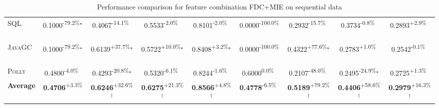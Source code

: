 \begin{table}[htbp]
\begin{tabular}{l|cccc|cccc}
\textsc{SQL} & \cellcolor{red!30}0.1000\textsuperscript{-79.2\%}$^\star$ & \cellcolor{red!30}0.4067\textsuperscript{-14.1\%}$^{\,\,\,}$ & \cellcolor{red!30}0.5533\textsuperscript{-2.0\%}$^{\,\,\,}$ & \cellcolor{red!30}0.8101\textsuperscript{-2.0\%}$^{\,\,\,}$ & \cellcolor{red!30}0.0000\textsuperscript{-100.0\%}$^{\,\,\,}$ & \cellcolor{red!30}0.2932\textsuperscript{-15.7\%}$^{\,\,\,}$ & \cellcolor{red!30}0.3734\textsuperscript{-0.8\%}$^{\,\,\,}$ & \cellcolor{green!30}0.2893\textsuperscript{+2.9\%}$^{\,\,\,}$ \\
\textsc{JavaGC} & \cellcolor{red!30}0.1000\textsuperscript{-79.2\%}$^\star$ & \cellcolor{green!30}0.6139\textsuperscript{+37.7\%}$^\star$ & \cellcolor{green!30}0.5722\textsuperscript{+10.0\%}$^\star$ & \cellcolor{green!30}0.8408\textsuperscript{+3.2\%}$^\star$ & \cellcolor{red!30}0.0000\textsuperscript{-100.0\%}$^{\,\,\,}$ & \cellcolor{green!30}0.4322\textsuperscript{+77.6\%}$^\star$ & \cellcolor{green!30}0.2783\textsuperscript{+1.0\%}$^{\,\,\,}$ & \cellcolor{red!30}0.2542\textsuperscript{-0.1\%}$^{\,\,\,}$ \\
\textsc{Polly} & \cellcolor{red!30}0.4800\textsuperscript{-4.0\%}$^{\,\,\,}$ & \cellcolor{red!30}0.4293\textsuperscript{-20.8\%}$^\star$ & \cellcolor{red!30}0.5320\textsuperscript{-6.1\%}$^{\,\,\,}$ & \cellcolor{red!30}0.8244\textsuperscript{-1.6\%}$^{\,\,\,}$ & \cellcolor{red!30}0.6000\textsuperscript{0.0\%}$^{\,\,\,}$ & \cellcolor{red!30}0.2107\textsuperscript{-48.0\%}$^{\,\,\,}$ & \cellcolor{red!30}0.2495\textsuperscript{-24.9\%}$^\star$ & \cellcolor{green!30}0.2725\textsuperscript{+1.3\%}$^{\,\,\,}$ \\
\hline
\textbf{Average} & \cellcolor{green!30}\textbf{0.4706}\textsuperscript{+3.3\%}$^{\,\,\,}$ & \cellcolor{green!30}\textbf{0.6246}\textsuperscript{+32.6\%}$^\dagger$ & \cellcolor{green!30}\textbf{0.6275}\textsuperscript{+21.3\%}$^\dagger$ & \cellcolor{green!30}\textbf{0.8566}\textsuperscript{+4.8\%}$^\dagger$ & \cellcolor{red!30}\textbf{0.4778}\textsuperscript{-6.5\%}$^{\,\,\,}$ & \cellcolor{green!30}\textbf{0.5189}\textsuperscript{+79.2\%}$^\dagger$ & \cellcolor{green!30}\textbf{0.4406}\textsuperscript{+58.6\%}$^\dagger$ & \cellcolor{green!30}\textbf{0.2979}\textsuperscript{+16.3\%}$^\dagger$ \\
\hline
\end{tabular}
\caption{Performance comparison for feature combination FDC+MIE on sequential data}
\label{tab:combo_FDC_MIE_performance_sequential}
\end{table}